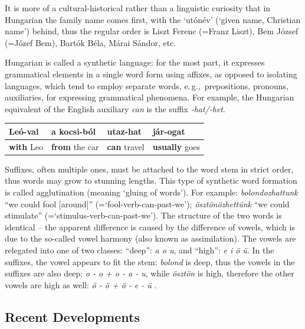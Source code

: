 \begin{multicols}{2}
It is more of a cultural-historical rather than a linguistic curiosity that in Hungarian the family name comes first, with the `utónév' (`given name, Christian name') behind, thus the regular order is Liszt Ferenc (=Franz Liszt), Bem József (=Józef Bem), Bartók Béla, Márai Sándor, etc.

Hungarian is called a synthetic language: for the most part, it expresses grammatical elements in a single word form using affixes, as opposed to isolating languages, which tend to employ separate words, e.\,g.,~prepositions, pronouns, auxiliaries, for expressing grammatical phenomena. For example, the Hungarian equivalent of the English auxiliary \textit{can} is the suffix \textit{-hat/-het}.

\vspace{3mm} 

\begin{tabular}{l|l|l|l}
    Leó-\textbf{val} & a kocsi-\textbf{ból} & utaz-\textbf{hat} & jár-\textbf{ogat}\\
    \hline
    \textbf{with} Leo & \textbf{from} the car & \textbf{can} travel & \textbf{usually} goes \\
  \end{tabular}

\vspace{3mm} 

Suffixes, often multiple ones, must be attached to the word stem in strict order, thus words may grow to stunning lengths. This type of synthetic word formation is called agglutination (meaning `gluing of words'). For example: \textit{bolondozhattunk} “we could fool [around]” (=`fool-verb-can-past-we'); \textit{ösztönözhettünk} “we could stimulate” (=`stimulus-verb-can-past-we'). The structure of the two words is identical -- the apparent difference is caused by the difference of vowels, which is due to the so-called vowel harmony (also known as assimilation). The vowels are relegated into one of two classes: “deep”: \textit{a o u}, and “high”: \textit{e i ö ü}. In the suffixes, the vowel appears to fit the stem: \textit{bolond} is deep, thus the vowels in the suffixes are also deep: \textit{o - o + o - a - u}, while \textit{ösztön} is high, therefore the other vowels are high as well: \textit{ö - ö + ö - e - ü} \cite{didyouknow1}.

\subsection{Recent Developments}


\end{multicols}
